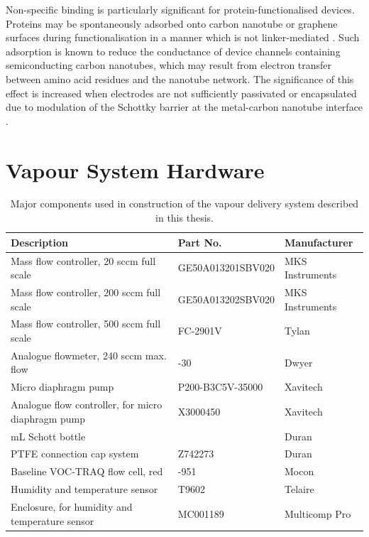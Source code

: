 \documentclass[
  a4paper,
]{scrbook}
\begin{document}
Non-specific binding is particularly significant for
protein-functionalised devices. Proteins may be spontaneously adsorbed
onto carbon nanotube or graphene surfaces during functionalisation in a
manner which is not linker-mediated
\autocite{Bradley2004,Star2003a,Chen2004}. Such adsorption is known to
reduce the conductance of device channels containing semiconducting
carbon nanotubes, which may result from electron transfer between amino
acid residues and the nanotube network. The significance of this effect
is increased when electrodes are not sufficiently passivated or
encapsulated due to modulation of the Schottky barrier at the
metal-carbon nanotube interface \autocite{Chen2004}.

\cleardoublepage
{}
{}
\appendix

\hypertarget{sec-vapour-sensor-components}{%
\chapter{Vapour System Hardware}\label{sec-vapour-sensor-components}}

\hypertarget{tbl-vapour-sensor-components}{}
\begin{longtable}[t]{>{\raggedright\arraybackslash}p{5.5cm}>{\raggedright\arraybackslash}p{4.5cm}>{\raggedright\arraybackslash}p{3.75cm}}
\caption{\label{tbl-vapour-sensor-components}Major components used in construction of the vapour delivery system
described in this thesis. }\tabularnewline

\toprule
Description & Part No. & Manufacturer\\
\midrule
Mass flow controller, 20 sccm full scale & GE50A013201SBV020 & MKS Instruments\\
Mass flow controller, 200 sccm full scale & GE50A013202SBV020 & MKS Instruments\\
Mass flow controller, 500 sccm full scale & FC-2901V & Tylan\\
Analogue flowmeter, 240 sccm max. flow & 116261-30 & Dwyer\\
Micro diaphragm pump & P200-B3C5V-35000 & Xavitech\\
\addlinespace
Analogue flow controller, for micro diaphragm pump & X3000450 & Xavitech\\
10 mL Schott bottle & 218010802 & Duran\\
PTFE connection cap system & Z742273 & Duran\\
Baseline VOC-TRAQ flow cell, red & 043-951 & Mocon\\
Humidity and temperature sensor & T9602 & Telaire\\
\addlinespace
Enclosure, for humidity and temperature sensor & MC001189 & Multicomp Pro\\
\bottomrule
\end{longtable}
\end{document}
